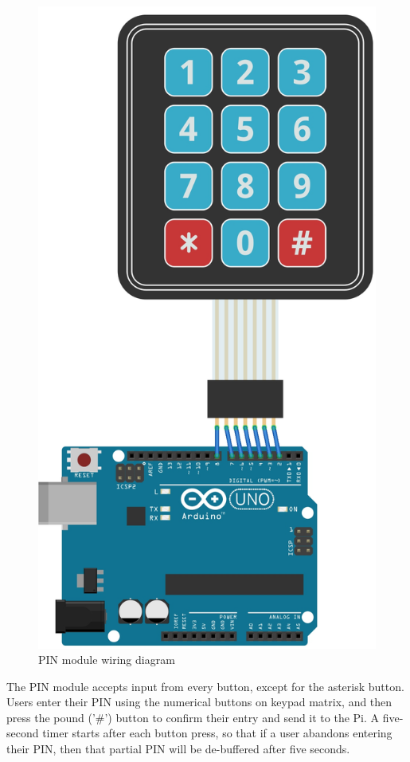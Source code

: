 \documentclass[12pt]{report}
\begin{document}
\begin{figure}
    \centering
    \includegraphics{Diagrams/Hardware-Diagrams/pin_module}
    \caption{PIN module wiring diagram}
    \label{fig:pin-module-wiring}
\end{figure}

The PIN module accepts input from every button, except for the asterisk button. Users enter their PIN using the 
numerical buttons on keypad matrix, and then press the pound ('\#') button to confirm their entry and send it to the 
Pi. A five-second timer starts after each button press, so that if a user abandons entering their PIN, then that 
partial PIN will be de-buffered after five seconds.
\end{document}
